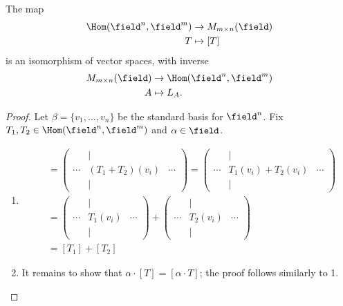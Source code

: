\begin{proposition}\label{prop:isomorphismbetweenhomandmat}
    The map \begin{align*}
        \Hom(\field^n, \field^m) &\to M_{m \times n}(\field)\\
         T &\mapsto [T]
    \end{align*}
    is an isomorphism of vector spaces, with inverse \begin{align*}
        M_{m \times n}(\field) &\to \Hom(\field^n, \field^m)\\
        A &\mapsto L_A.
    \end{align*}
\end{proposition}

\begin{proof}
     Let $\beta = \{v_1, \dots, v_n\}$ be the standard basis for $\field^n$. Fix $T_1, T_2 \in \Hom(\field^n, \field^m)$ and $\alpha \in \field$. 
    \begin{enumerate}
        \item \begin{align*}
            [T_1 + T_2] &= \begin{pmatrix}
         & \vert & \\
            \cdots & (T_1+T_2)(v_i) & \cdots\\
            & \vert & 
        \end{pmatrix} = \begin{pmatrix}
            & \vert & \\
               \cdots & T_1(v_i)+T_2(v_i) & \cdots\\
                & \vert & 
           \end{pmatrix}\\ 
           &= \begin{pmatrix}
            & \vert &\\
            \cdots & T_1(v_i) & \cdots\\
            & \vert & 
           \end{pmatrix} + \begin{pmatrix}
            & \vert &\\
            \cdots & T_2(v_i) & \cdots\\
            & \vert & 
           \end{pmatrix} \\
           &= [T_1] + [T_2]
        \end{align*}
        \item It remains to show that $\alpha \cdot [T] = [\alpha \cdot T]$; the proof follows similarly to 1.

\end{enumerate}
\end{proof}
